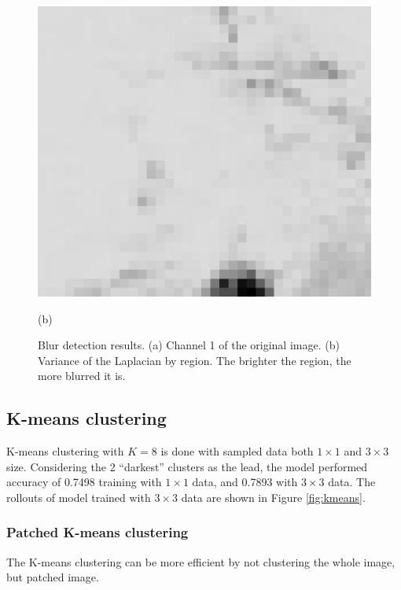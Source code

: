 \documentclass{article}
\begin{document}
\begin{figure}[ht]
\begin{minipage}{0.49\hsize}
                \includegraphics[width = 1\hsize]{2_blur.png}
                \caption*{(b)}
            \end{minipage}
            \caption{
                Blur detection results.
                (a) Channel 1 of the original image.
                (b) Variance of the Laplacian by region.
                The brighter the region, the more blurred it is.
            }
            \label{fig:blur}
        \end{figure}

    \subsection{K-means clustering} \label{sec:kmeans}
        K-means clustering with $K = 8$ is done with sampled data
        both $1\times 1$ and $3\times 3$ size.
        Considering the 2 ``darkest'' clusters as the lead,
        the model performed accuracy of 0.7498 training with $1\times 1$ data,
        and 0.7893 with $3\times 3$ data.
        The rollouts of model trained with $3\times 3$ data
        are shown in Figure \ref{fig:kmeans}.

        \subsubsection{Patched K-means clustering}
            The K-means clustering can be more efficient by
            not clustering the whole image, but patched image.
            
\end{document}
